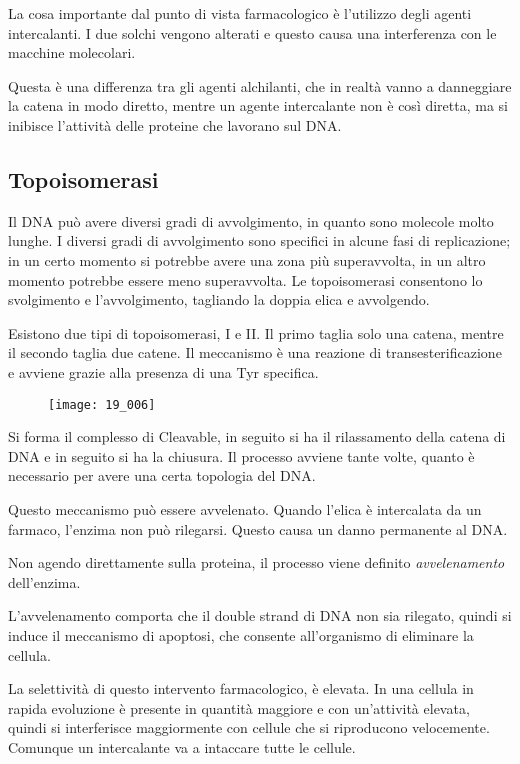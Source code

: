 
La cosa importante dal punto di vista farmacologico è l'utilizzo degli
agenti intercalanti. I due solchi vengono alterati e questo causa una
interferenza con le macchine molecolari.

Questa è una differenza tra gli
agenti alchilanti, che in realtà vanno a danneggiare la catena in modo
diretto, mentre un agente intercalante non è così diretta, ma si
inibisce l'attività delle proteine che lavorano sul DNA.

\subsection{Topoisomerasi}

Il DNA può avere diversi gradi di avvolgimento, in quanto sono molecole
molto lunghe. I diversi gradi di avvolgimento sono specifici in alcune
fasi di replicazione; in un certo momento si potrebbe avere una zona più
superavvolta, in un altro momento potrebbe essere meno superavvolta. Le
topoisomerasi consentono lo svolgimento e l'avvolgimento, tagliando la
doppia elica e avvolgendo.

Esistono due tipi di topoisomerasi, I e II. Il primo taglia solo una
catena, mentre il secondo taglia due catene. Il meccanismo è una
reazione di transesterificazione e avviene grazie alla presenza di una
Tyr specifica.

\begin{figure}[H]
  \centering
  \texttt{[image: 19\_006]}
\end{figure}

Si forma il complesso di Cleavable, in seguito si ha il rilassamento
della catena di DNA e in seguito si ha la chiusura. Il processo avviene
tante volte, quanto è necessario per avere una certa topologia del DNA.

Questo meccanismo può essere avvelenato. Quando l'elica è intercalata da
un farmaco, l'enzima non può rilegarsi. Questo causa un danno permanente
al DNA.

Non agendo direttamente sulla proteina, il processo viene definito
\emph{avvelenamento} dell'enzima.

L'avvelenamento comporta che il double strand di DNA non sia rilegato,
quindi si induce il meccanismo di apoptosi, che consente all'organismo
di eliminare la cellula.

La selettività di questo intervento farmacologico, è elevata. In una
cellula in rapida evoluzione è presente in quantità maggiore e con
un'attività elevata, quindi si interferisce maggiormente con cellule che
si riproducono velocemente. Comunque un intercalante va a intaccare
tutte le cellule.

